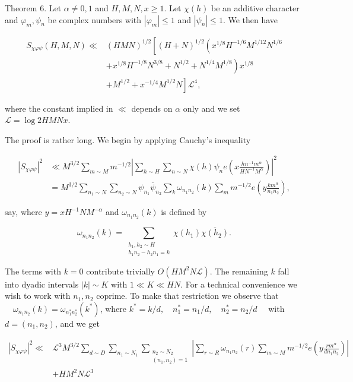 \documentclass[10pt]{article}
\begin{document}
Theorem 6. Let $\alpha \neq 0,1$ and $H, M, N, x \geqslant 1$. Let $\chi(h)$ be an additive character and $\varphi_{m}, \psi_{n}$ be complex numbers with $\left|\varphi_{m}\right| \leqslant 1$ and $\left|\psi_{n}\right| \leqslant 1$. We then have

$$
\begin{aligned}
S_{\chi\varphi\psi}(H, M, N) \ll & (H M N)^{1 / 2}\left[( H + N ) ^ { 1 / 2 } \left(x^{1 / 8} H^{-1 / 6} M^{1 / 12} N^{1 / 6}\right.\right. \\
& \left.+x^{1 / 8} H^{-1 / 8} N^{3 / 8}+N^{1 / 2}+N^{1 / 4} M^{1 / 8}\right) x^{1 / 8} \\
& \left.+M^{1 / 2}+x^{-1 / 4} M^{1 / 2} N\right] \mathscr{L}^{4},
\end{aligned}
$$

where the constant implied in $\ll$ depends on $\alpha$ only and we set $\mathscr{L}=\log 2 H M N x$.

The proof is rather long. We begin by applying Cauchy's inequality

$$
\begin{aligned}
\left|S_{\chi\varphi\psi}\right|^{2} & \ll M^{3/2} \sum_{m \sim M} m^{-1 / 2}\left|\sum_{h \sim H} \sum_{n \sim N} \chi(h) \psi_{n} e\left(x \frac{h n^{-1} m^{\alpha}}{H N^{-1} M^{\alpha}}\right)\right|^{2} \\
&=M^{3 / 2} \sum_{n_{1} \sim N}\sum_{n_{2} \sim N} \psi_{n_1}\overline{\psi}_{n_2} \sum_{k} \omega_{n_{1} n_{2}}(k) \sum_{m} m^{-1 / 2} e\left(y \frac{k m^{\alpha}}{n_{1} n_{2}}\right),
\end{aligned}
$$

say, where $y=x H^{-1} N M^{-\alpha}$ and $\omega_{n_1n_2}(k)$ is defined by

$$
\omega_{n_1n_2}(k)=
\sum_{\substack{h_1,h_2\sim H\\h_1n_2-h_2n_1=k}}
\chi(h_1)\overline{\chi(h_2)}.
$$

The terms with $k=0$ contribute trivially $O\left(H M^{2} N \mathscr{L}\right)$. The remaining $k$ fall into dyadic intervals $|k| \sim K$ with $1\ll K\ll HN$. For a technical convenience we wish to work with $n_{1}, n_{2}$ coprime. To make that restriction we observe that $\quad \omega_{n_{1} n_{2}}(k)=\omega_{n_{1}^{*} n_{2}^{*}}\left(k^{*}\right)$, where $k^{*}=k / d, \quad n_{1}^{*}=n_{1} / d, \quad n_{2}^{*}=n_{2} / d \quad$ with $d=\left(n_{1}, n_{2}\right)$, and we get

$$
\begin{aligned}
\left|S_{\chi\varphi\psi}\right|^{2}\ll & \mathscr{L}^{3} M^{3 / 2} \sum_{d \sim D} \sum_{n_{1} \sim N_{1}} \sum_{\substack{n_{2} \sim N_{2} \\
\left(n_{1}, n_{2}\right)=1}}\left|\sum_{r \sim R} \omega_{n_{1} n_{2}}(r) \sum_{m \sim M} m^{-1 / 2} e\left(y \frac{r m^{\alpha}}{d n_{1} n_{2}}\right)\right| \\
& +H M^{2} N \mathscr{L}^{3}
\end{aligned}
$$
\end{document}
